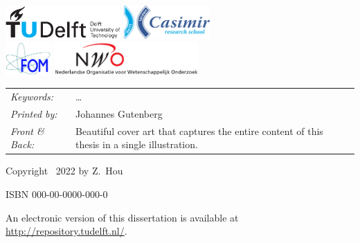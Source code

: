\begin{titlepage}
\vfill
\begin{center}
    \includegraphics[height=0.5in]{title/logos/tudelft}
    \hspace{2em}
    \includegraphics[height=0.5in]{title/logos/casimir} \\
    \includegraphics[height=0.5in]{title/logos/fom}
    \hspace{2em}
    \includegraphics[height=0.5in]{title/logos/nwo}
\end{center}
\vfill

\noindent
\begin{tabular}{@{}p{}@{}p{}}
    \textit{Keywords:} & \ldots \\[\medskipamount]
    \textit{Printed by:} & Johannes Gutenberg \\[\medskipamount]
    \textit{Front \& Back:} & Beautiful cover art that captures the entire content of this thesis in a single illustration.
\end{tabular}

\vspace{4\bigskipamount}

\noindent Copyright \textcopyright\ 2022 by Z.~Hou


\medskip
\noindent ISBN 000-00-0000-000-0

\medskip
\noindent An electronic version of this dissertation is available at \\
\url{http://repository.tudelft.nl/}.


\end{titlepage}
